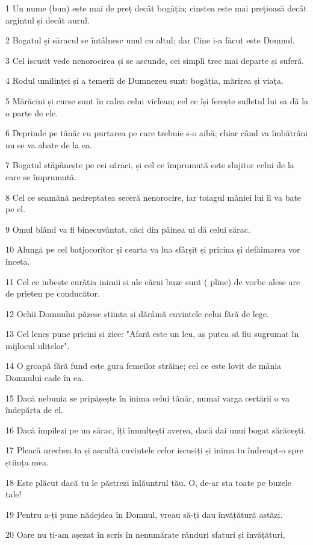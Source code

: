 \par 1 Un nume (bun) este mai de preț decât bogăția; cinstea este mai prețioasă decât argintul și decât aurul.
\par 2 Bogatul și săracul se întâlnesc unul cu altul; dar Cine i-a făcut este Domnul.
\par 3 Cel iscusit vede nenorocirea și se ascunde, cei simpli trec mai departe și suferă.
\par 4 Rodul umilinței și a temerii de Dumnezeu sunt: bogăția, mărirea și viața.
\par 5 Mărăcini și curse sunt în calea celui viclean; cel ce își ferește sufletul lui sa dă la o parte de ele.
\par 6 Deprinde pe tânăr cu purtarea pe care trebuie s-o aibă; chiar când va îmbătrâni nu se va abate de la ea.
\par 7 Bogatul stăpânește pe cei săraci, și cel ce împrumută este slujitor celui de la care se împrumută.
\par 8 Cel ce seamănă nedreptatea seceră nenorocire, iar toiagul mâniei lui îl va bate pe el.
\par 9 Omul blând va fi binecuvântat, căci din pâinea ui dă celui sărac.
\par 10 Alungă pe cel batjocoritor și cearta va lua sfârșit și pricina și defăimarea vor înceta.
\par 11 Cel ce iubește curăția inimii și ale cărui buze sunt ( pline) de vorbe alese are de prieten pe conducător.
\par 12 Ochii Domnului păzesc știința și dărâmă cuvintele celui fără de lege.
\par 13 Cel leneș pune pricini și zice: "Afară este un leu, aș putea să fiu sugrumat în mijlocul ulițelor".
\par 14 O groapă fără fund este gura femeilor străine; cel ce este lovit de mânia Domnului cade în ea.
\par 15 Dacă nebunia se pripășește în inima celui tânăr, numai varga certării o va îndepărta de el.
\par 16 Dacă împilezi pe un sărac, îți înmulțești averea, dacă dai unui bogat sărăcești.
\par 17 Pleacă urechea ta și ascultă cuvintele celor iscusiți și inima ta îndreapt-o spre știința mea.
\par 18 Este plăcut dacă tu le păstrezi înlăuntrul tău. O, de-ar sta toate pe buzele tale!
\par 19 Pentru a-ți pune nădejdea în Domnul, vreau să-ți dau învățătură astăzi.
\par 20 Oare nu ți-am așezat în scris în nenumărate rânduri sfaturi și învățături,
